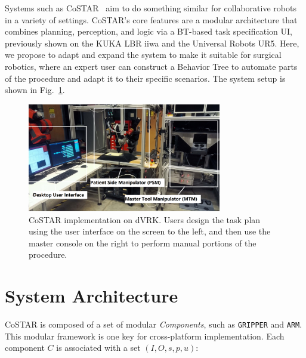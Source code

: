\documentclass[letterpaper, 10 pt, conference]{ieeeconf}
\begin{document}


Systems such as CoSTAR~\cite{paxton2017costar} aim to do something similar for collaborative robots in a variety of settings. 
CoSTAR's core features are a modular architecture that combines planning, perception, and logic via a BT-based task specification UI, previously shown on the KUKA LBR iiwa and the Universal Robots UR5. Here, we propose to adapt and expand the system to make it suitable for surgical robotics, where an expert user can construct a Behavior Tree to automate parts of the procedure and adapt it to their specific scenarios.
The system setup is shown in Fig.~\ref{fig:dvrk}. 

\begin{figure}[bt]
\centering
\includegraphics[width=240pt]{dvrk.png}
\caption{CoSTAR implementation on dVRK. Users design the task plan using the user interface on the screen to the left, and then use the master console on the right to perform manual portions of the procedure.}
\label{fig:dvrk}
\end{figure}


\section{System Architecture}
CoSTAR is composed of a set of modular \textit{Components}, such as \texttt{GRIPPER} and \texttt{ARM}. This modular framework is one key for cross-platform implementation. Each component $C$ is associated with a set $(I,O,s,p,u)$: 
\end{document}
